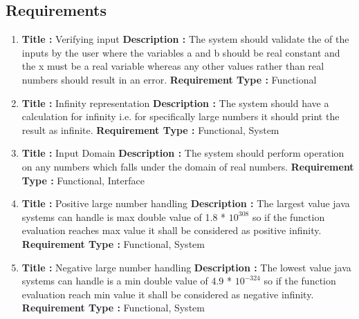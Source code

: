 \documentclass[a4paper, 11pt]{article}
\begin{document}
\subsection{Requirements} 
\begin{enumerate}
    \item \textbf{Title :} Verifying input \newline 
    \textbf{Description : } The system should validate the of the inputs by the user where the variables a and b should be real constant and the x must be a real variable whereas any other values rather than real numbers should result in an error. \newline
    \textbf{Requirement Type : } Functional
    
    \item \textbf{Title :} Infinity representation \newline 
    \textbf{Description : } The system should have a calculation for infinity i.e. for specifically large numbers it should print the result as infinite. \newline
    \textbf{Requirement Type : } Functional, System
    
    \item \textbf{Title :} Input Domain \newline 
    \textbf{Description : } The system should perform operation on any numbers which falls under the domain of real numbers. \newline
    \textbf{Requirement Type : } Functional, Interface
    
    \item \textbf{Title :} Positive large number handling \newline 
    \textbf{Description : } The largest value java systems can handle is max double value of 1.8 * $10^{308}$ so if the function evaluation reaches max value it shall be considered as positive infinity. \newline
    \textbf{Requirement Type : } Functional, System
    
    \item \textbf{Title :} Negative large number handling \newline 
    \textbf{Description : } The lowest value java systems can handle is a min double value of 4.9 * $10^{-324}$ so if the function evaluation reach min value it shall be considered as negative infinity. \newline
    \textbf{Requirement Type : } Functional, System
    

\end{enumerate}
\end{document}
